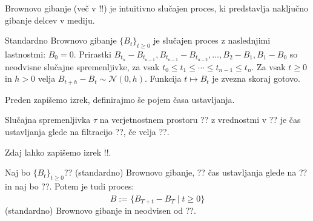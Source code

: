 \documentclass[11pt]{article}
\begin{document}
Brownovo gibanje (več v !!) je intuitivno slučajen proces, %
ki predstavlja naključno gibanje delcev v mediju.
    

    Standardno Brownovo gibanje $\{B_t\}_{t \geq 0}$ je slučajen proces z naslednjimi lastnostmi: 
        $B_0 = 0$.
        Prirastki $B_{t_n} - B_{t_{n-1}}, B_{t_{n-1}} - B_{t_{n-2}}, \ldots, B_2 - B_1, B_1 - B_0$ so neodvisne slučajne spremenljivke, za vsak $t_0 \leq t_1 \leq \cdots \leq t_{n-1} \leq t_n$.
        Za vsak $t \geq 0$ in $h > 0$ velja $B_{t+h} - B_t \sim \mathcal{N}(0, h)$.
        Funkcija $t \mapsto B_t$ je zvezna skoraj gotovo.
    
    Preden zapišemo izrek, definirajmo še pojem časa ustavljanja.
    
    Slučajna spremenljivka $\tau$ na verjetnostnem prostoru ?? z vrednostmi v ??
    je čas ustavljanja glede na filtracijo ??, če velja ??.
    
    Zdaj lahko zapišemo izrek !!. %
    
    Naj bo $\{B_t\}_{t \geq 0}$?? (standardno) Brownovo gibanje, ?? čas ustavljanja glede na 
    ?? in naj bo ??.
    Potem je tudi proces:
    \[
    \hat{B} := \{B_{T+t} - B_T \mid t \geq 0\}
    \]
    (standardno) Brownovo gibanje in neodvisen od ??.
    
\end{document}
